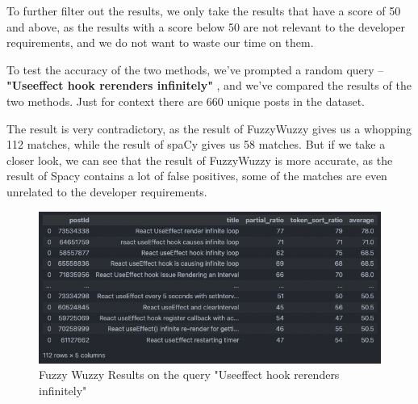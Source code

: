 To further filter out the results, we only take the results that have a score of 50 and above, as the results with a score below 50 are not relevant to the developer requirements, and we do not want to waste our time on them. 

To test the accuracy of the two methods, we've prompted a random query --  \textbf{"Useeffect hook rerenders infinitely" }, and we've compared the results of the two methods. Just for context there are 660 unique posts in the dataset.

The result is very contradictory, as the result of FuzzyWuzzy gives us a whopping 112 matches, while the result of spaCy gives us 58 matches. But if we take a closer look, we can see that the result of FuzzyWuzzy is more accurate, as the result of Spacy contains a lot of false positives, some of the matches are even unrelated to the developer requirements. 

\begin{figure}[H]
  \noindent \includegraphics[scale=0.65]{assets/fuzzy-wuzzy-query-1-results.png}
\caption{Fuzzy Wuzzy Results on the query "Useeffect hook rerenders infinitely"}\label{fuzzy_wuzzy_query_1_results}
\end{figure}

